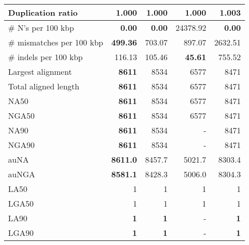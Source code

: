 \documentclass[12pt,a4paper]{article}
\begin{document}
\begin{table}[ht]
\begin{center}
\begin{tabular}{|l*{4}{|r}|}
Duplication ratio & {\bf 1.000} & {\bf 1.000} & {\bf 1.000} & 1.003 \\ \hline
\# N's per 100 kbp & {\bf 0.00} & {\bf 0.00} & 24378.92 & {\bf 0.00} \\ \hline
\# mismatches per 100 kbp & {\bf 499.36} & 703.07 & 897.07 & 2632.51 \\ \hline
\# indels per 100 kbp & 116.13 & 105.46 & {\bf 45.61} & 755.52 \\ \hline
Largest alignment & {\bf 8611} & 8534 & 6577 & 8471 \\ \hline
Total aligned length & {\bf 8611} & 8534 & 6577 & 8471 \\ \hline
NA50 & {\bf 8611} & 8534 & 6577 & 8471 \\ \hline
NGA50 & {\bf 8611} & 8534 & 6577 & 8471 \\ \hline
NA90 & {\bf 8611} & 8534 & - & 8471 \\ \hline
NGA90 & {\bf 8611} & 8534 & - & 8471 \\ \hline
auNA & {\bf 8611.0} & 8457.7 & 5021.7 & 8303.4 \\ \hline
auNGA & {\bf 8581.1} & 8428.3 & 5006.0 & 8304.3 \\ \hline
LA50 & 1 & 1 & 1 & 1 \\ \hline
LGA50 & 1 & 1 & 1 & 1 \\ \hline
LA90 & {\bf 1} & {\bf 1} & - & {\bf 1} \\ \hline
LGA90 & {\bf 1} & {\bf 1} & - & {\bf 1} \\ \hline
\end{tabular}
\end{center}
\end{table}
\end{document}
